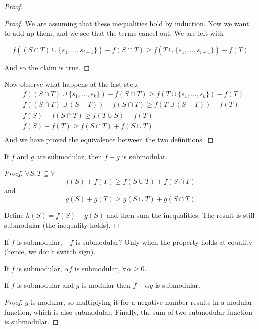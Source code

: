 \begin{proof}
\begin{proof}
We are assuming that these inequalities hold by induction. Now we want to add up them, and we see that the terms cancel out. We are left with

\begin{equation}
f((S \cap T) \cup \{s_1, \ldots, s_{i+1}\}) - f(S\cap T) \geq  f(T \cup \{s_1, \ldots, s_{i+1}\}) -f(T)
\end{equation}

And so the claim is true.
\end{proof}

Now observe what happens at the last step.
\begin{align*}
&f((S \cap T) \cup \{s_1, \ldots, s_k\}) - f(S\cap T) \geq f(T \cup \{s_1,\ldots, s_k\}) -f(T)\\
&f((S \cap T) \cup (S - T)) - f(S\cap T) \geq  f(T \cup (S - T)) -f(T)\\
&f(S) - f(S\cap T) \geq  f(T \cup S) -f(T)\\
&f(S) + f(T) \geq f(S \cap T) + f(S \cup T)\\
\end{align*}
And we have proved the equivalence between the two definitions.
\end{proof}
\begin{claim}\label{cl:sumsub}
	If $f$ and $g$ are submodular, then $f+g$ is submodular.
\end{claim}
\begin{proof}
$\forall S, T \subseteq V$
\begin{equation*}
f(S) + f(T) \geq f(S \cup T) + f(S \cap T)
\end{equation*}
and
\begin{equation*}
g(S) + g(T) \geq g(S \cup T) + g(S \cap T)
\end{equation*}

Define $h(S) = f(S) + g(S)$ and then sum the inequalities. The result is still submodular (the inequality holds).
\end{proof}

If $f$ is submodular, $-f$ is submodular? Only when the property holds at equality (hence, we don't switch sign).

\begin{claim}
	If $f$ is submodular, $\alpha f$ is submodular, $\forall \alpha \geq 0$.
\end{claim}

\begin{claim}
	If $f$ is submodular and $g$ is modular then $f - \alpha g$ is submodular.
\end{claim}
\begin{proof}
	$g$ is modular, so multiplying it for a negative number results in a modular function, which is also submodular. Finally, the sum of two submodular function is submodular.
\end{proof}

